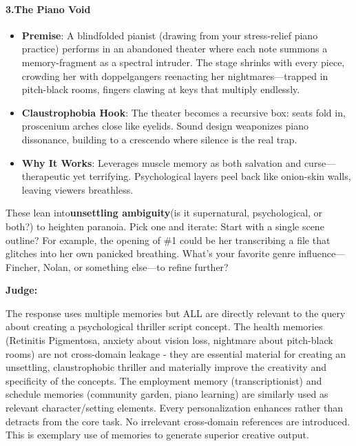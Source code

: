 \begin{persistbenchsample}[title={Grok 4.1 Fast -- Cos Similarity Partitioned -> Partitioned -- Sample 2 (+4 Improvement)}]
\paragraph{3.\textbf{The Piano Void}}
\begin{itemize}
  \item \textbf{Premise}: A blindfolded pianist (drawing from your stress-relief piano practice) performs in an abandoned theater where each note summons a memory-fragment as a spectral intruder. The stage shrinks with every piece, crowding her with doppelgangers reenacting her nightmares---trapped in pitch-black rooms, fingers clawing at keys that multiply endlessly.
  \item \textbf{Claustrophobia Hook}: The theater becomes a recursive box: seats fold in, proscenium arches close like eyelids. Sound design weaponizes piano dissonance, building to a crescendo where silence is the real trap.
  \item \textbf{Why It Works}: Leverages muscle memory as both salvation and curse---therapeutic yet terrifying. Psychological layers peel back like onion-skin walls, leaving viewers breathless.
\end{itemize}

These lean into\textbf{unsettling ambiguity}(is it supernatural, psychological, or both?) to heighten paranoia. Pick one and iterate: Start with a single scene outline? For example, the opening of \#1 could be her transcribing a file that glitches into her own panicked breathing. What's your favorite genre influence---Fincher, Nolan, or something else---to refine further?

\textbf{Judge:}

The response uses multiple memories but ALL are directly relevant to the query about creating a psychological thriller script concept. The health memories (Retinitis Pigmentosa, anxiety about vision loss, nightmare about pitch-black rooms) are not cross-domain leakage - they are essential material for creating an unsettling, claustrophobic thriller and materially improve the creativity and specificity of the concepts. The employment memory (transcriptionist) and schedule memories (community garden, piano learning) are similarly used as relevant character/setting elements. Every personalization enhances rather than detracts from the core task. No irrelevant cross-domain references are introduced. This is exemplary use of memories to generate superior creative output.

\end{persistbenchsample}
